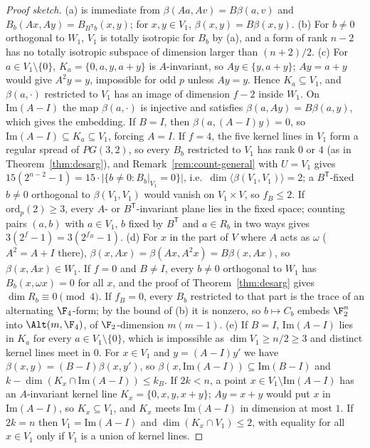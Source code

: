\begin{proof}[Proof sketch]
(a) is immediate from $\beta(Aa,Av)=B\beta(a,v)$ and
$B_b(Ax,Ay)=B_{B^{\mathsf T}b}(x,y)$; for $x,y\in V_1$, $\beta(x,y)=B\beta(x,y)$.
(b) For $b\neq0$ orthogonal to $W_1$, $V_1$ is totally isotropic for $B_b$ by (a), and a form
of rank $n-2$ has no totally isotropic subspace of dimension larger than $(n+2)/2$.
(c) For $a\in V_1\setminus\{0\}$, $K_a=\{0,a,y,a+y\}$ is $A$-invariant, so $Ay\in\{y,a+y\}$;
$Ay=a+y$ would give $A^2y=y$, impossible for odd $p$ unless $Ay=y$. Hence $K_a\subseteq V_1$,
and $\beta(a,\cdot)$ restricted to $V_1$ has an image of dimension $f-2$ inside $W_1$. On
$\mathrm{Im}(A-I)$ the map $\beta(a,\cdot)$ is injective and satisfies
$\beta(a,Ay)=B\beta(a,y)$, which gives the embedding. If $B=I$, then
$\beta(a,(A-I)y)=0$, so $\mathrm{Im}(A-I)\subseteq K_a\subseteq V_1$, forcing $A=I$. If
$f=4$, the five kernel lines in $V_1$ form a regular spread of $PG(3,2)$, so every
$B_b$ restricted to $V_1$ has rank $0$ or $4$ (as in Theorem~\ref{thm:desarg}), and
Remark~\ref{rem:count-general} with $U=V_1$ gives $15(2^{n-2}-1)=15\cdot|\{b\neq0:B_b|_{V_1}=0\}|$,
i.e.\ $\dim\langle\beta(V_1,V_1)\rangle=2$;
a $B^{\mathsf T}$-fixed $b\ne0$ orthogonal to $\beta(V_1,V_1)$ would vanish on $V_1\times V$,
so $f_B\le2$. If $\mathrm{ord}_p(2)\ge3$, every $A$- or $B^{\mathsf T}$-invariant plane lies in
the fixed space; counting pairs $(a,b)$ with $a\in V_1$, $b$ fixed by $B^{\mathsf T}$ and
$a\in R_b$ in two ways gives $3(2^f-1)=3(2^{f_B}-1)$.
(d) For $x$ in the part of $V$ where $A$ acts as $\omega$ ($A^2=A+I$ there),
$\beta(x,Ax)=\beta(Ax,A^2x)=B\beta(x,Ax)$, so $\beta(x,Ax)\in W_1$. If $f=0$ and $B\ne I$, every
$b\neq0$ orthogonal to $W_1$ has $B_b(x,\omega x)=0$ for all $x$, and the proof of
Theorem~\ref{thm:desarg} gives $\dim R_b\equiv0\pmod 4$. If $f_B=0$, every $B_b$ restricted
to that part is the trace of an alternating $\F_4$-form; by the bound of (b) it is nonzero, so
$b\mapsto C_b$ embeds $\F_2^n$ into $\Alt(m,\F_4)$, of $\F_2$-dimension $m(m-1)$.
(e) If $B=I$, $\mathrm{Im}(A-I)$ lies in $K_a$ for every $a\in V_1\setminus\{0\}$, which is
impossible as $\dim V_1\ge n/2\ge 3$ and distinct kernel lines meet in $0$. For $x\in V_1$ and
$y=(A-I)y'$ we have $\beta(x,y)=(B-I)\beta(x,y')$, so $\beta(x,\mathrm{Im}(A-I))\subseteq
\mathrm{Im}(B-I)$ and $k-\dim(K_x\cap\mathrm{Im}(A-I))\le k_B$. If $2k<n$, a point
$x\in V_1\setminus\mathrm{Im}(A-I)$ has an $A$-invariant kernel line $K_x=\{0,x,y,x+y\}$; $Ay=x+y$
would put $x$ in $\mathrm{Im}(A-I)$, so $K_x\subseteq V_1$, and $K_x$ meets $\mathrm{Im}(A-I)$ in
dimension at most $1$. If $2k=n$ then $V_1=\mathrm{Im}(A-I)$ and $\dim(K_x\cap V_1)\le2$, with
equality for all $x\in V_1$ only if $V_1$ is a union of kernel lines.
\end{proof}

